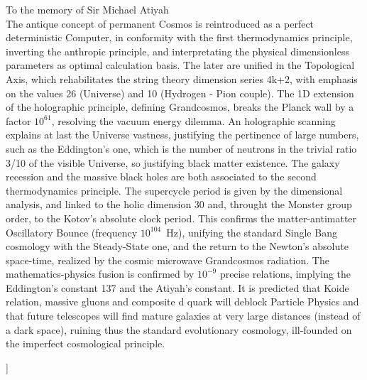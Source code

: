 \documentclass[twoside,draft]{article}
\begin{document}
\begin{sloppypar}
\begin{center}
{}\par
\medskip
{\small\parbox{11cm}{%
\hfill To the memory of Sir Michael Atiyah\\
The antique concept of permanent Cosmos is reintroduced as a perfect deterministic Computer, in conformity with the first thermodynamics principle, inverting the anthropic principle, and interpretating the physical dimensionless parameters as optimal calculation basis. The later are unified in the Topological Axis, which rehabilitates the string theory dimension series 4k+2, with emphasis on the values 26 (Universe) and 10 (Hydrogen - Pion couple). The 1D extension of the holographic principle, defining Grandcosmos, breaks the Planck wall by a factor $10^{61}$, resolving the vacuum energy dilemma. An holographic scanning explains at last the Universe vastness, justifying the pertinence of large numbers, such as the Eddington's one, which is the number of neutrons in the trivial ratio 3/10 of the visible Universe, so justifying black matter existence. The galaxy recession and the massive black holes are both associated to the second thermodynamics principle. The supercycle period is given by the dimensional analysis, and linked to the holic dimension 30 and, throught the Monster group order, to the Kotov's absolute clock period. This confirms the matter-antimatter Oscillatory Bounce (frequency $10^{104}$~Hz), unifying the standard Single Bang cosmology with the Steady-State one, and the return to the Newton's absolute space-time, realized by the cosmic microwave Grandcosmos radiation. The mathematics-physics fusion is confirmed by $10^{-9}$ precise relations, implying the Eddington's constant 137 and the Atiyah's constant. It is predicted that Koide relation, massive gluons and composite d quark will deblock Particle Physics and that future telescopes will find mature galaxies at very large distances (instead of a dark space), ruining thus the standard evolutionary cosmology, ill-founded on the imperfect cosmological principle.

}}\smallskip
\end{center}]{%


\setcounter{section}{0}
\setcounter{equation}{0}
\setcounter{figure}{0}
\setcounter{table}{0}
\setcounter{page}{1}



}
\end{sloppypar}
\end{document}
